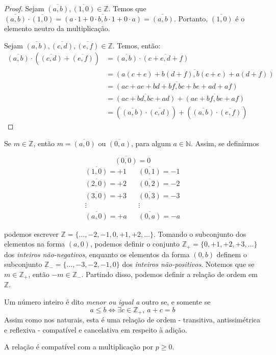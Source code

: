 \begin{proof}
Sejam $\overline{(a,b)},\overline{(1,0)} \in \mathbb{Z}$. Temos que $\overline{(a,b)}\cdot \overline{(1,0)}=\overline{(a\cdot 1+0\cdot b,b\cdot 1+0\cdot a)}=\overline{(a,b)}$. Portanto, $\overline{(1,0)}$ é o elemento neutro da multiplicação.\par  Sejam $\overline{(a,b)}, \overline{(c,d)}, \overline{(e,f)} \in \mathbb{Z}$. Temos, então:
\begin{align*}
\overline{(a,b)}\cdot\left(\overline{(c,d)}+\overline{(e,f)}\right) &= \overline{(a,b)} \cdot \overline{(c+e,d+f)}\\
&=\overline{(a(c+e)+b(d+f),b(c+e)+a(d+f))}\\
&=\overline{(ac+ae+bd+bf,bc+be+ad+af)}\\
&=\overline{(ac+bd,bc+ad)}+\overline{(ae+bf,be+af)}\\
&=\left(\overline{(a,b)}\cdot \overline{(c,d)}\right)+\left( \overline{(a,b)}\cdot\overline{(e,f)}\right)
\end{align*}
\end{proof}

Se $m \in \mathbb{Z}$, então $m=\overline{(a,0)}$ ou $\overline{(0,a)}$, para algum $a \in \mathbb{N}$. Assim, se definirmos

\[\overline{(0,0)}=0\]
\vspace{-20pt}
\begin{align*}
\overline{(1,0)}=+1& &\overline{(0,1)}=-1 \\
\overline{(2,0)}=+2& &\overline{(0,2)}=-2 \\
\overline{(3,0)}=+3& &\overline{(0,3)}=-3 \\
\vdots \qquad & &  \vdots \qquad \\
\overline{(a,0)}=+a& &\overline{(0,a)}=-a
\end{align*}%

podemos escrever $\mathbb{Z}=\{\dots,-2,-1,0,+1,+2,\dots\}$. Tomando o subconjunto dos elementos na forma $(a,0)$, podemos definir o conjunto $\mathbb{Z}_+=\{0,+1,+2,+3,\dots\}$ dos \emph{inteiros não-negativos}, enquanto os elementos da forma $(0,b)$ definem o subconjunto $\mathbb{Z}_-=\{\dots, -3,-2,-1,0\}$ dos \emph{inteiros não-positivos}. Notemos que se $m \in \mathbb{Z}_+$, então $-m\in \mathbb{Z}_-$. Partindo disso, podemos definir a relação de ordem em $\mathbb{Z}$.

\begin{df}
Um número inteiro é dito \emph{menor ou igual a} outro se, e somente se
\[a\le b \Leftrightarrow \exists c\in \mathbb{Z}_+, \: a+c=b\]
Assim como nos naturais, esta é uma relação de ordem - transitiva, antissimétrica e reflexiva - compatível e cancelativa em respeito à adição.
\end{df}
A relação é compatível com a multiplicação por $p\ge 0$.

